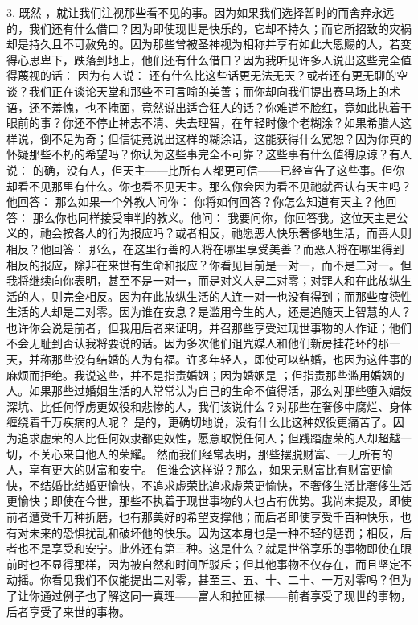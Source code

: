 3. 既然 ，就让我们注视那些看不见的事。因为如果我们选择暂时的而舍弃永远的，我们还有什么借口？因为即使现世是快乐的，它却不持久；而它所招致的灾祸却是持久且不可赦免的。因为那些曾被圣神视为相称并享有如此大恩赐的人，若变得心思卑下，跌落到地上，他们还有什么借口？因为我听见许多人说出这些完全值得蔑视的话： 因为有人说： 还有什么比这些话更无法无天？或者还有更无聊的空谈？我们正在谈论天堂和那些不可言喻的美善；而你却向我们提出赛马场上的术语，还不羞愧，也不掩面，竟然说出适合狂人的话？你难道不脸红，竟如此执着于眼前的事？你还不停止神志不清、失去理智，在年轻时像个老糊涂？如果希腊人这样说，倒不足为奇；但信徒竟说出这样的糊涂话，这能获得什么宽恕？因为你真的怀疑那些不朽的希望吗？你认为这些事完全不可靠？这些事有什么值得原谅？有人说： 的确，没有人，但天主——比所有人都更可信——已经宣告了这些事。但你却看不见那里有什么。你也看不见天主。那么你会因为看不见祂就否认有天主吗？他回答： 那么如果一个外教人问你： 你将如何回答？你怎么知道有天主？他回答： 那么你也同样接受审判的教义。他问： 我要问你，你回答我。这位天主是公义的，祂会按各人的行为报应吗？或者相反，祂愿恶人快乐奢侈地生活，而善人则相反？他回答： 那么，在这里行善的人将在哪里享受美善？而恶人将在哪里得到相反的报应，除非在来世有生命和报应？你看见目前是一对一，而不是二对一。但我将继续向你表明，甚至不是一对一，而是对义人是二对零；对罪人和在此放纵生活的人，则完全相反。因为在此放纵生活的人连一对一也没有得到；而那些度德性生活的人却是二对零。因为谁在安息？是滥用今生的人，还是追随天上智慧的人？也许你会说是前者，但我用后者来证明，并召那些享受过现世事物的人作证；他们不会无耻到否认我将要说的话。因为多次他们诅咒媒人和他们新房挂花环的那一天，并称那些没有结婚的人为有福。许多年轻人，即使可以结婚，也因为这件事的麻烦而拒绝。我说这些，并不是指责婚姻；因为婚姻是  ；但指责那些滥用婚姻的人。如果那些过婚姻生活的人常常认为自己的生命不值得活，那么对那些堕入娼妓深坑、比任何俘虏更奴役和悲惨的人，我们该说什么？对那些在奢侈中腐烂、身体缠绕着千万疾病的人呢？ 是的，更确切地说，没有什么比这种奴役更痛苦了。因为追求虚荣的人比任何奴隶都更奴性，愿意取悦任何人；但践踏虚荣的人却超越一切，不关心来自他人的荣耀。 然而我们经常表明，那些摆脱财富、一无所有的人，享有更大的财富和安宁。 但谁会这样说？那么，如果无财富比有财富更愉快，不结婚比结婚更愉快，不追求虚荣比追求虚荣更愉快，不奢侈生活比奢侈生活更愉快；即使在今世，那些不执着于现世事物的人也占有优势。我尚未提及，即使前者遭受千万种折磨，也有那美好的希望支撑他；而后者即使享受千百种快乐，也有对未来的恐惧扰乱和破坏他的快乐。因为这本身也是一种不轻的惩罚；相反，后者也不是享受和安宁。此外还有第三种。这是什么？就是世俗享乐的事物即使在眼前时也不显得那样，因为被自然和时间所驳斥；但其他事物不仅存在，而且坚定不动摇。你看见我们不仅能提出二对零，甚至三、五、十、二十、一万对零吗？但为了让你通过例子也了解这同一真理——富人和拉匝禄——前者享受了现世的事物，后者享受了来世的事物。 